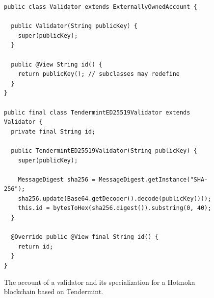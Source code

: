 \begin{figure}[t]
  \begin{center}
    \begin{lstlisting}[language=Takamaka]
public class Validator extends ExternallyOwnedAccount {

  public Validator(String publicKey) {
    super(publicKey);
  }

  public @View String id() {
    return publicKey(); // subclasses may redefine
  }
}

public final class TendermintED25519Validator extends Validator {
  private final String id;

  public TendermintED25519Validator(String publicKey) {
    super(publicKey);

    MessageDigest sha256 = MessageDigest.getInstance("SHA-256");
    sha256.update(Base64.getDecoder().decode(publicKey()));
    this.id = bytesToHex(sha256.digest()).substring(0, 40);
  }

  @Override public @View final String id() {
    return id;
  }
}
    \end{lstlisting}
  \end{center}
  \caption{The account of a validator and its specialization for a Hotmoka blockchain based on Tendermint.}\label{fig:validator}
\end{figure}
